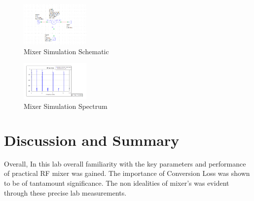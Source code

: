 \documentclass[journal]{IEEEtran}
\begin{document}
\begin{figure}[hp]
    \centering
    \includegraphics[width=0.3\textwidth]{sim_schem.png}
    \caption{\label{fig:sim_schem} Mixer Simulation Schematic }
\end{figure}

\begin{figure}[hp]
    \centering
    \includegraphics[width=0.3\textwidth]{sim_spectrum.png}
    \caption{\label{fig:sim_spectrum} Mixer Simulation Spectrum }
\end{figure}


\section{Discussion and Summary}

Overall, In this lab  overall familiarity with the key parameters and
performance of practical RF mixer was gained. The importance of Conversion Loss
was shown to be of tantamount significance. The non idealities of mixer's was
evident through these precise lab measurements.

\appendices
\end{document}
